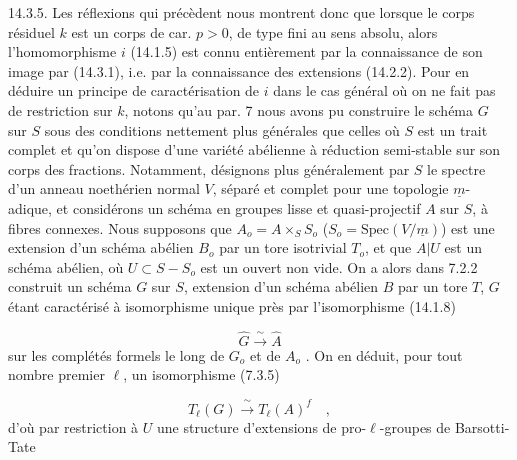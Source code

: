 14.3.5. Les réflexions qui précèdent nous montrent donc que lorsque le corps résiduel $k$ est un corps de car. $p > 0$, de type fini au sens absolu, alors l'homomorphisme $i$ (14.1.5) est connu entièrement par la connaissance de son image par (14.3.1), i.e. par la connaissance des extensions (14.2.2). Pour en déduire un principe de caractérisation de $i$ dans le cas général où on ne fait pas de restriction sur $k$, notons qu'au par. 7 nous avons pu construire le schéma $G$ sur $S$ sous des conditions nettement plus générales que celles où $S$ est un trait complet et qu'on dispose d'une variété abélienne à réduction semi-stable sur son corps des fractions. Notamment, désignons plus généralement par $S$ le spectre d'un anneau noethérien normal $V$, séparé et complet pour une topologie $\underline{m}$-adique, et considérons un schéma en groupes lisse et quasi-projectif $A$ sur $S$, à fibres connexes. Nous supposons que $A_o = A \times_S S_o$ ($S_o = \mathrm{Spec}(V/\underline{m})$) est une extension d'un schéma abélien $B_o$ par un tore isotrivial $T_o$, et que $A|U$ est un schéma abélien, où $U \subset S - S_o$ est un ouvert non vide. On a alors dans 7.2.2 construit un schéma $G$ sur $S$, extension d'un schéma abélien $B$ par un tore $T$, $G$ étant caractérisé à isomorphisme unique près par l'isomorphisme (14.1.8)

\begin{equation}\tag{14.3.5.1}
\hat{G} \xrightarrow{\ \sim\ } \hat{A}
\end{equation}
sur les complétés formels le long de $G_o$ et de $A_o$ . On en déduit, pour tout nombre premier $\ell$, un isomorphisme (7.3.5)



\begin{equation}\tag{14.3.5.2}
T_\ell(G) \xrightarrow{\ \sim\ } T_\ell(A)^f \quad ,
\end{equation}
d'où par restriction à $U$ une structure d'extensions de pro-$\ell$-groupes de Barsotti-Tate

